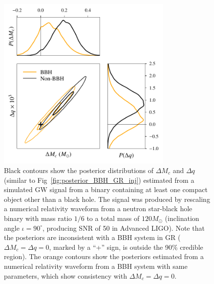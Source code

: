 \documentclass[prl,preprintnumbers,twocolumn,eqsecnum,floatfix,a4paper,nofootinbib,superscriptaddress]{revtex4}
\begin{document}
\begin{figure}[tbh] \begin{center}
\includegraphics[width=3.4in]{figs/posteriors_BBH_rescaled_NSBH.pdf}
\caption{Black contours show the posterior distributions of $\Delta M_c$ and $\Delta q$ (similar to Fig~\ref{fig:posterior_BBH_GR_inj}) estimated from a simulated GW signal from a binary containing at least one compact object other than a black hole. The signal was produced by rescaling a numerical relativity waveform from a neutron star-black hole binary with mass ratio $1/6$ to a total mass of $120 M_\odot$ (inclination angle $\iota = 90^\circ$, producing SNR of 50 in Advanced LIGO). Note that the posteriors are inconsistent with a BBH system in GR ($\Delta M_c = \Delta q = 0$, marked by a ``+'' sign, is outside the 90\% credible region). The orange contours show the posteriors estimated from a numerical relativity waveform from a BBH system with same parameters, which show consistency with $\Delta M_c = \Delta q = 0$.} 
\label{fig:posterior_nonBBH_inj}
\end{center} \end{figure}
\end{document}
